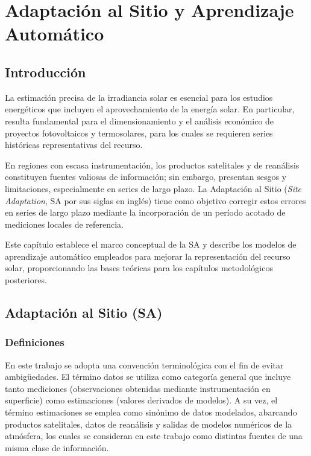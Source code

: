 \rhead{}
\cfoot{\thepage}
\renewcommand{\headrulewidth}{1pt}
\renewcommand{\footrulewidth}{1pt}

\chapter{Adaptación al Sitio y Aprendizaje Automático}\label{ch_2}

\section{Introducción}


La estimación precisa de la irradiancia solar es esencial para los estudios energéticos que incluyen el aprovechamiento de la energía solar. En particular, resulta fundamental para el dimensionamiento y el análisis económico de proyectos fotovoltaicos y termosolares, para los cuales se requieren series históricas representativas del recurso.

En regiones con escasa instrumentación, los productos satelitales y de reanálisis constituyen fuentes valiosas de información; sin embargo, presentan sesgos y limitaciones, especialmente en series de largo plazo. La Adaptación al Sitio (\textit{Site Adaptation}, SA por sus siglas en inglés) tiene como objetivo corregir estos errores en series de largo plazo mediante la incorporación de un período acotado de mediciones locales de referencia.

Este capítulo establece el marco conceptual de la SA y describe los modelos de aprendizaje automático empleados para mejorar la representación del recurso solar, proporcionando las bases teóricas para los capítulos metodológicos posteriores.

\section{Adaptación al Sitio (SA)}

\subsection{Definiciones}
En este trabajo se adopta una convención terminológica con el fin de evitar ambigüedades. El término datos se utiliza como categoría general que incluye tanto mediciones (observaciones obtenidas mediante instrumentación en superficie) como estimaciones (valores derivados de modelos). A su vez, el término estimaciones se emplea como sinónimo de datos modelados, abarcando productos satelitales, datos de reanálisis y salidas de modelos numéricos de la atmósfera, los cuales se consideran en este trabajo como distintas fuentes de una misma clase de información.

